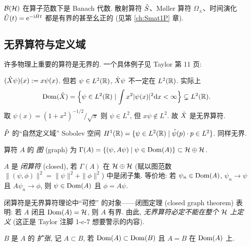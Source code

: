 $\mathcal{B}(\mathcal{H})$ 在算子范数下是 Banach 代数. 散射算符 $\hat{S}$、Møller 算符 $\Omega_\pm$、时间演化 $\hat{U}(t)=\mathrm{e}^{-\mathrm{i}\hat{H}t}$ 都是有界的甚至幺正的 (见第 \ref{ch:Smat1P} 章).

\subsection{无界算符与定义域}

许多物理上重要的算符是无界的. 一个具体例子见 Taylor 第 11 页:

\begin{example}[位置算符 $\Op{X}$ 在 $L^2(\R)$ 上]\label{ex:hilbert-position}
$(\hat{X}\psi)(x):=x\psi(x)$. 但若 $\psi\in L^2(\mathbb{R})$, $\hat{X}\psi$ 不一定在 $L^2(\R)$. 实际上
\begin{equation}\label{eq:hilbert-domX}
\operatorname{Dom}(\hat{X})=\Bigl\{\psi\in L^2(\mathbb{R})\mid\int x^2|\psi(x)|^2\mathrm{d} x<\infty\Bigr\}\subsetneq L^2(\mathbb{R}).
\end{equation}
取 $\psi(x)=(1+x^2)^{-1/2}/\sqrt{\pi}$ 则 $\psi\in L^2$, 但 $x\psi\notin L^2$. 故 $\Op{X}$ 是无界算符.
\end{example}

\begin{example}[动量算符 $\Op{P}=-\rmi\partial_x$]\label{ex:hilbert-momentum}
$\hat{P}$ 的``自然定义域'' Sobolev 空间 $H^1(\mathbb{R})=\{\psi\in L^2(\mathbb{R})\mid\hat\psi(p)\cdot p\in L^2\}$. 同样无界.
\end{example}

\begin{definition}[算符的图]\label{def:hilbert-graph}
算符 $A$ 的 \emph{图} (graph) 为 $\Gamma(A)=\{(\psi,A\psi)\mid\psi\in\operatorname{Dom}(A)\}\subset\mathcal{H}\oplus\mathcal{H}$.
\end{definition}

\begin{definition}[闭算符]\label{def:hilbert-closed}
$A$ 是 \emph{闭算符} (closed), 若 $\Gamma(A)$ 在 $\mathcal{H}\oplus\mathcal{H}$ (赋以图范数 $\|(\psi,\phi)\|^2=\|\psi\|^2+\|\phi\|^2$) 中是闭子集. 等价地: 若 $\psi_n\in\operatorname{Dom}(A)$, $\psi_n\to\psi$ 且 $A\psi_n\to\phi$, 则 $\psi\in\operatorname{Dom}(A)$ 且 $\phi=A\psi$.
\end{definition}

闭算符是无界算符理论中``可控'' 的对象——闭图定理 (closed graph theorem) 表明: 若 $A$ 闭且 $\operatorname{Dom}(A)=\mathcal{H}$, 则 $A$ 有界. 由此, \emph{无界算符必定不能在整个 $\mathcal{H}$ 上定义} (这正是 Taylor 注脚 1-c-7 想要警示的内容).

\begin{definition}[算符的扩张/限制]\label{def:hilbert-extension}
$B$ 是 $A$ 的 \emph{扩张}, 记 $A\subset B$, 若 $\operatorname{Dom}(A)\subset\operatorname{Dom}(B)$ 且 $A=B$ 在 $\operatorname{Dom}(A)$ 上.
\end{definition}

